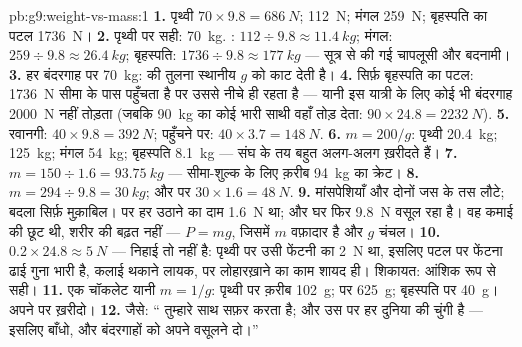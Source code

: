 \begin{solution}{pb:g9:weight-vs-mass:1}
\textbf{1.} पृथ्वी $70 \times 9.8 = \qty{686}{N}$; 
\qty{112}{N}; मंगल \qty{259}{N}; बृहस्पति का पटल \qty{1736}{N}।
\textbf{2.} पृथ्वी पर सही: \qty{70}{kg}. : $112 \div 9.8
\approx \qty{11.4}{kg}$; मंगल: $259 \div 9.8 \approx \qty{26.4}{kg}$;
बृहस्पति: $1736 \div 9.8 \approx \qty{177}{kg}$ --- सूत्र से की
गई चापलूसी और बदनामी।
\textbf{3.} हर बंदरगाह पर \qty{70}{kg}:  की तुलना स्थानीय $g$ को
काट देती है।
\textbf{4.} सिर्फ़ बृहस्पति का पटल: \qty{1736}{N} सीमा के पास पहुँचता
है पर उससे नीचे ही रहता है --- यानी इस यात्री के लिए कोई भी बंदरगाह
\qty{2000}{N} नहीं तोड़ता (जबकि \qty{90}{kg} का कोई भारी साथी वहाँ
तोड़ देता: $90 \times 24.8 = \qty{2232}{N}$).
\textbf{5.} रवानगी: $40 \times 9.8 = \qty{392}{N}$; पहुँचने पर:
$40 \times 3.7 = \qty{148}{N}$.
\textbf{6.} $m = 200/g$: पृथ्वी \qty{20.4}{kg}; 
\qty{125}{kg}; मंगल \qty{54}{kg}; बृहस्पति \qty{8.1}{kg} --- संघ के
तय  बहुत अलग-अलग  ख़रीदते हैं।
\textbf{7.} $m = 150 \div 1.6 = \qty{93.75}{kg}$ ---
सीमा-शुल्क के लिए क़रीब \qty{94}{kg} का क्रेट।
\textbf{8.} $m = 294 \div 9.8 = \qty{30}{kg}$; और  पर 
$30 \times 1.6 = \qty{48}{N}$.
\textbf{9.} मांसपेशियाँ और  दोनों जस के तस लौटे; बदला सिर्फ़
मुक़ाबिल।  पर हर  उठाने का दाम \qty{1.6}{N} था; और घर
फिर \qty{9.8}{N} वसूल रहा है। वह कमाई  की छूट थी, शरीर की बढ़त
नहीं --- $P = m g$, जिसमें $m$ वफ़ादार है और $g$ चंचल।
\textbf{10.} $0.2 \times 24.8 \approx \qty{5}{N}$ --- निहाई तो नहीं
है: पृथ्वी पर उसी फेंटनी का  \qty{2}{N} था, इसलिए पटल पर फेंटना
ढाई गुना भारी है, कलाई थकाने लायक, पर लोहारख़ाने का काम शायद ही।
शिकायत: आंशिक रूप से सही।
\textbf{11.} एक  चॉकलेट यानी $m = 1/g$: पृथ्वी पर क़रीब
\qty{102}{g};  पर \qty{625}{g}; बृहस्पति पर \qty{40}{g}। अपने
  पर ख़रीदो।
\textbf{12.} जैसे: `` तुम्हारे साथ सफ़र करता है; और  उस पर
हर दुनिया की चुंगी है --- इसलिए  बाँधो, और बंदरगाहों को अपने
 वसूलने दो।''
\end{solution}
